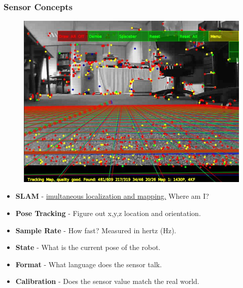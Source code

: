 \documentclass[compress]{beamer}
\begin{document}
\begin{frame}
  \frametitle{Sensor Concepts}
  \begin{figure}
     \includegraphics[width=0.4\linewidth]{ptam.jpg}
  \end{figure}

   \begin{itemize}
   \item \textbf{SLAM} - \href{http://www.youtube.com/watch?v=Y9HMn6bd-v8}{imultaneous localization and mapping.} Where am I?
   \item \textbf{Pose Tracking} - Figure out x,y,z location and orientation.
   \item \textbf{Sample Rate} - How fast? Measured in hertz (Hz). 
   \item \textbf{State} - What is the current pose of the robot.
   \item \textbf{Format} - What language does the sensor talk.
   \item \textbf{Calibration} - Does the sensor value match the real world. 
   \end{itemize}     
 \end{frame}
\end{document}
